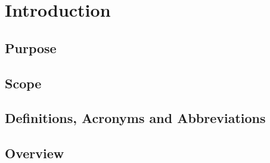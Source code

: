 \section{Introduction}
\subsection{Purpose}
\subsection{Scope}
\subsection{Definitions, Acronyms and Abbreviations}

\subsection{Overview}
